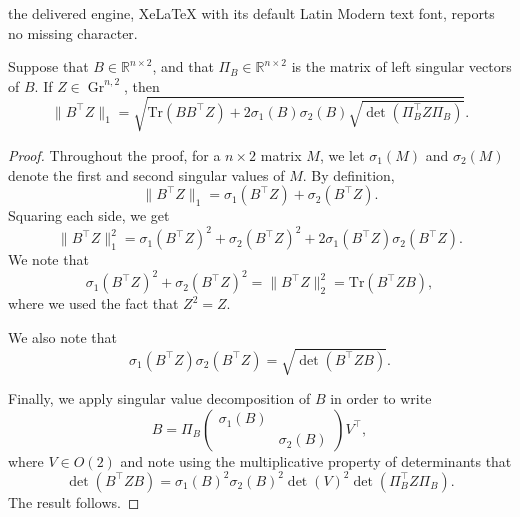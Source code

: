 \documentclass[10pt,a4paper]{amsart}
\DeclareMathOperator{\Gr}{Gr}
\newcommand{\R}{\mathbb{R}}
\newcommand{\tr}{\mathrm{Tr}}
\begin{document}
the delivered engine, XeLaTeX with its default Latin Modern text font, reports no missing character.
\begin{lemma}\label{lemma:norm-BZ-n-l}
    Suppose that $B \in \R^{n \times 2}$, and that $\Pi_B \in \R^{n \times 2}$ is the matrix of left singular vectors of $B$.
    If $Z \in \Gr^{n,2}$, then 
    \begin{equation}\label{eq:norm-BZ-n-2}
        \|B^{\intercal}Z\|_1 = \sqrt{\tr(BB^{\intercal}Z) + 2\sigma_1(B) \sigma_2(B)\sqrt{\det(\Pi_B^{\intercal}Z\Pi_B)}}.
     \end{equation}
\end{lemma}

\begin{proof}
    Throughout the proof, for a $n\times 2$ matrix $M$, we let $\sigma_1(M)$ and $\sigma_2(M)$ denote the first and second singular values of $M$.
    By definition, 
    \[
        \|B^{\intercal}Z\|_1 = \sigma_1(B^{\intercal}Z) + \sigma_2(B^{\intercal}Z).
    \]
    Squaring each side, we get
    \[
        \|B^{\intercal}Z\|_1^2 = \sigma_1(B^{\intercal}Z)^2 + \sigma_2(B^{\intercal}Z)^2 + 2\sigma_1(B^{\intercal}Z)\sigma_2(B^{\intercal}Z).
    \]
    We note that 
    \[
        \sigma_1(B^{\intercal}Z)^2 + \sigma_2(B^{\intercal}Z)^2 = \|B^{\intercal}Z\|_2^2 = \tr(B^{\intercal}ZB),
    \]
    where we 
    used the fact that $Z^2 = Z$.

    We also note that
    \[
        \sigma_1(B^{\intercal}Z)\sigma_2(B^{\intercal}Z) = \sqrt{\det(B^{\intercal}ZB)}.
    \]

    Finally, we apply singular value decomposition of $B$ in order to write
    \[
        B = \Pi_B \begin{pmatrix}\sigma_1(B) & \\ & \sigma_2(B)\end{pmatrix} V^{\intercal},
    \]
    where $V \in O(2)$ and note using the multiplicative property of determinants that
    \[
        \det(B^{\intercal}ZB) =  \sigma_1(B)^2\sigma_2(B)^2\det(V)^2\det(\Pi_B^{\intercal}Z\Pi_B).
    \]
    The result follows.
\end{proof}
\end{document}
